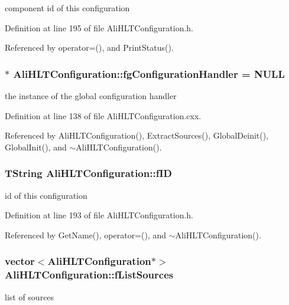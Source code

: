 component id of this configuration 

Definition at line 195 of file Ali\-HLTConfiguration.h.

Referenced by operator=(), and Print\-Status().
\subsubsection{ $\ast$ {\bf Ali\-HLTConfiguration::fg\-Configuration\-Handler} = NULL\hspace{0.3cm}{\tt  [static, private]}}\label{classAliHLTConfiguration_v0}


the instance of the global configuration handler 

Definition at line 138 of file Ali\-HLTConfiguration.cxx.

Referenced by Ali\-HLTConfiguration(), Extract\-Sources(), Global\-Deinit(), Global\-Init(), and $\sim$Ali\-HLTConfiguration().
\subsubsection{\setlength{\rightskip}{0pt plus 5cm}TString {\bf Ali\-HLTConfiguration::f\-ID}\hspace{0.3cm}{\tt  [private]}}\label{classAliHLTConfiguration_r0}


id of this configuration 

Definition at line 193 of file Ali\-HLTConfiguration.h.

Referenced by Get\-Name(), operator=(), and $\sim$Ali\-HLTConfiguration().
\subsubsection{\setlength{\rightskip}{0pt plus 5cm}vector$<${\bf Ali\-HLTConfiguration}$\ast$$>$ {\bf Ali\-HLTConfiguration::f\-List\-Sources}\hspace{0.3cm}{\tt  [private]}}\label{classAliHLTConfiguration_r4}


list of sources 

